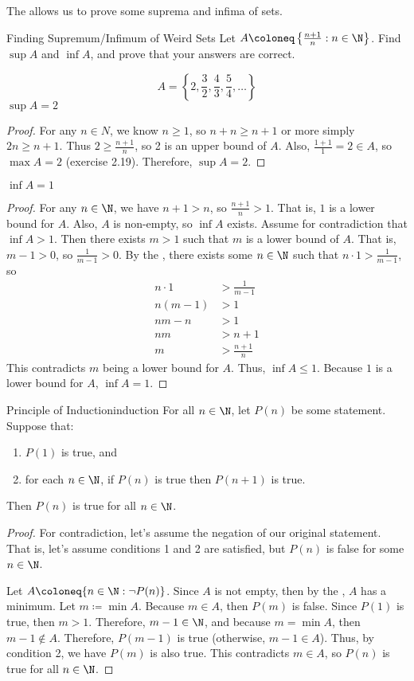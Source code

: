 \documentclass[letterpaper,12pt]{report}
\begin{document}
The  allows us to prove some suprema and infima of sets.

\begin{exbox}{Finding Supremum/Infimum of Weird Sets}{}
	Let $A \coloneq \left\{ \frac{n+1}{n} : n \in \N \right\}$. Find $\sup A$ and $\inf A$, and prove that your answers are correct.

	$$A = \left\{ 2, \frac32, \frac43, \frac54, \ldots \right\}$$
	\tcblower
	$\sup A = 2$
	\begin{proof}
		For any $n \in N$, we know $n \geq 1$, so $n+n \geq n + 1$ or more simply $2n \geq n+1$. Thus $2 \geq \frac{n+1}{n}$, so 2 is an upper bound of $A$. Also, $\frac{1+1}{1} = 2 \in A$, so $\max A = 2$ (exercise 2.19). Therefore, $\sup A = 2$.
	\end{proof}

	$\inf A = 1$
	\begin{proof}
		For any $n \in \N$, we have $n+1 > n$, so $\frac{n+1}{n}>1$. That is, $1$ is a lower bound for $A$. Also, $A$ is non-empty, so $\inf A$ exists. Assume for contradiction that $\inf A > 1$. Then there exists $m>1$ such that $m$ is a lower bound of $A$. That is, $m-1 > 0$, so $\frac{1}{m-1} > 0$. By the , there exists some $n \in \N$ such that $n \cdot 1 > \frac{1}{m-1}$, so
		\begin{align*}
			n \cdot 1 &> \frac{1}{m-1}\\
			n(m-1) &> 1\\
			nm-n &> 1 \\
			nm &> n+1 \\
			m &> \frac{n+1}{n}
		\end{align*}
		This contradicts $m$ being a lower bound for $A$. Thus, $\inf A \leq 1$. Because $1$ is a lower bound for $A$, $\inf A = 1$.
	\end{proof}
\end{exbox}

\begin{thmbox}{Principle of Induction}{induction}
	For all $n \in \N$, let $P(n)$ be some statement. Suppose that:
	\begin{enumerate}
		\item $P(1)$ is true, and
		\item for each $n \in \N$, if $P(n)$ is true then $P(n+1)$ is true.
	\end{enumerate}
	Then $P(n)$ is true for all $n \in \N$.
	\tcblower
	\begin{proof}
		For contradiction, let's assume the negation of our original statement. That is, let's assume conditions 1 and 2 are satisfied, but $P(n)$ is false for some $n \in \N$.

		Let $A \coloneq \{ n \in \N : \neg P(n) \}$. Since $A$ is not empty, then by the , $A$ has a minimum. Let $m \coloneq \min A$. Because $m \in A$, then $P(m)$ is false. Since $P(1)$ is true, then $m > 1$. Therefore, $m-1 \in \N$, and because $m = \min A$, then $m-1 \notin A$. Therefore, $P(m-1)$ is true (otherwise, $m-1 \in A$). Thus, by condition 2, we have $P(m)$ is also true. This contradicts $m \in A$, so $P(n)$ is true for all $n \in \N$.
	\end{proof}
\end{thmbox}
\end{document}
